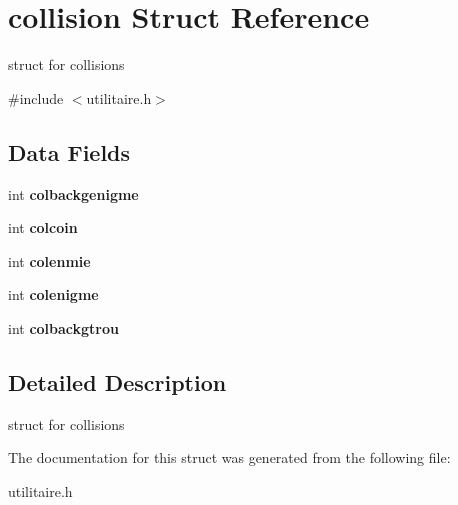 \hypertarget{structcollision}{}\section{collision Struct Reference}
\label{structcollision}


struct for collisions  




{\ttfamily \#include $<$utilitaire.\+h$>$}

\subsection*{Data Fields}
\begin{DoxyCompactItemize}
\item 
int {\bfseries colbackgenigme}\hypertarget{structcollision_abcf86bca0068fca534f11c600c941da0}{}\label{structcollision_abcf86bca0068fca534f11c600c941da0}

\item 
int {\bfseries colcoin}\hypertarget{structcollision_a103941a41d31cbdb5a58c24fc75089a4}{}\label{structcollision_a103941a41d31cbdb5a58c24fc75089a4}

\item 
int {\bfseries colenmie}\hypertarget{structcollision_a71198421cdcfa728868a19e9e24507dc}{}\label{structcollision_a71198421cdcfa728868a19e9e24507dc}

\item 
int {\bfseries colenigme}\hypertarget{structcollision_a1ac28c83a10d8349661c5924338d5aa4}{}\label{structcollision_a1ac28c83a10d8349661c5924338d5aa4}

\item 
int {\bfseries colbackgtrou}\hypertarget{structcollision_abb7c93a7aed306b754319095b1dae1f7}{}\label{structcollision_abb7c93a7aed306b754319095b1dae1f7}

\end{DoxyCompactItemize}


\subsection{Detailed Description}
struct for collisions 

The documentation for this struct was generated from the following file\+:\begin{DoxyCompactItemize}
\item 
utilitaire.\+h\end{DoxyCompactItemize}
